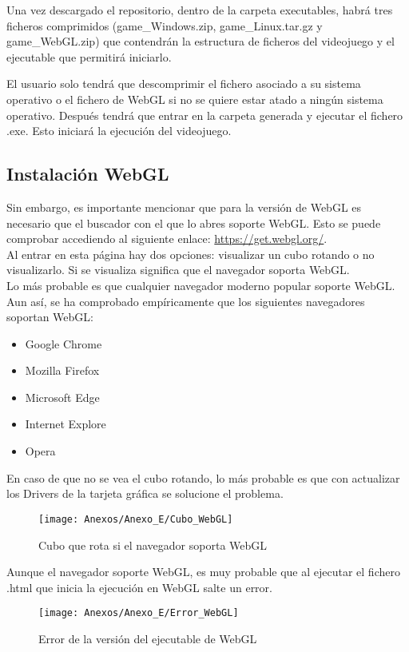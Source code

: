 Una vez descargado el repositorio, dentro de la carpeta executables, habrá tres ficheros comprimidos (game\_Windows.zip, game\_Linux.tar.gz y game\_WebGL.zip) que contendrán la estructura de ficheros del videojuego y el ejecutable que permitirá iniciarlo.

El usuario solo tendrá que descomprimir el fichero asociado a su sistema operativo o el fichero de WebGL si no se quiere estar atado a ningún sistema operativo. Después tendrá que entrar en la carpeta generada y ejecutar el fichero .exe. Esto iniciará la ejecución del videojuego.

\subsection{Instalación WebGL}
Sin embargo, es importante mencionar que para la versión de WebGL es necesario que el buscador con el que lo abres soporte WebGL. Esto se puede comprobar accediendo al siguiente enlace: \url{https://get.webgl.org/}.\\ 
Al entrar en esta página hay dos opciones: visualizar un cubo rotando o no visualizarlo. Si se visualiza significa que el navegador soporta WebGL.\\
Lo más probable es que cualquier navegador moderno popular soporte WebGL. Aun así, se ha comprobado empíricamente que los siguientes navegadores soportan WebGL:
\begin{itemize}
\item
Google Chrome
\item
Mozilla Firefox
\item
Microsoft Edge
\item
Internet Explore
\item
Opera
\end{itemize}

En caso de que no se vea el cubo rotando, lo más probable es que con actualizar los Drivers de la tarjeta gráfica se solucione el problema.

\clearpage
\begin{figure}[h]
\centering
\texttt{[image: Anexos/Anexo\_E/Cubo\_WebGL]}
\caption{Cubo que rota si el navegador soporta WebGL}
\end{figure}

Aunque el navegador soporte WebGL, es muy probable que al ejecutar el fichero .html que inicia la ejecución en WebGL salte un error.

\begin{figure}[h]
\centering
\texttt{[image: Anexos/Anexo\_E/Error\_WebGL]}
\caption{Error de la versión del ejecutable de WebGL}
\end{figure}

